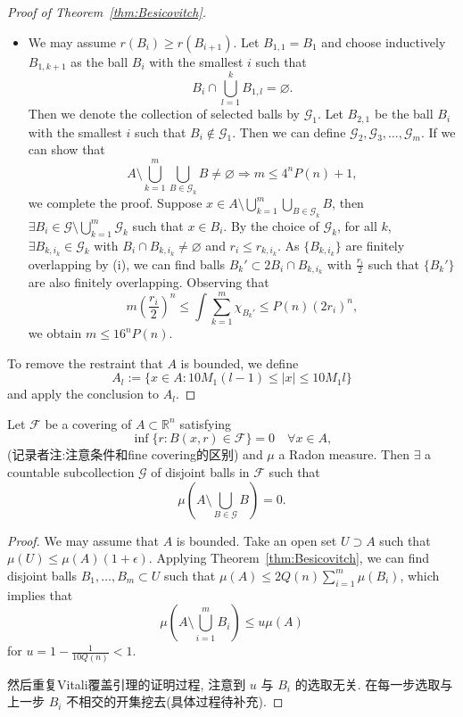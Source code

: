 \begin{proof}[Proof of Theorem~\ref{thm:Besicovitch}]
\begin{itemize}
    \item[(ii)] We may assume $r(B_{i})\geq r(B_{i+1})$. Let $B_{1,1}=B_{1}$ and choose inductively $B_{1,k+1}$ as the ball $B_{i}$ with the smallest $i$ such that $$B_{i}\cap \bigcup _{l=1}^{k}B_{1,l}=\varnothing.$$Then we denote the collection of selected balls by $\mathscr{G}_{1}$.
   Let $B_{2,1}$ be the ball $B_{i}$ with the smallest $i$ such that $B_{i}\not\in \mathscr{G}_{1}$. Then we can define $\mathscr{G}_{2},\mathscr{G}_{3},\dots,\mathscr{G}_{m}$. If we can show that $$A\setminus \bigcup _{k=1}^{m}\bigcup _{B \in \mathscr{G}_{k}}B\neq \varnothing\Longrightarrow m\leq 4^{n}P(n)+1,$$we complete the proof.
   Suppose $x \in A\setminus \bigcup _{k=1}^{m}\bigcup _{B \in \mathscr{G}_{k}}B$, then $\exists B_{i}\in \mathscr{G}\setminus \bigcup _{k=1}^{m}\mathscr{G}_{k}$ such that $x \in B_{i}$. By the choice of $\mathscr{G}_{k}$, for all $k$, $\exists B_{k,i_{k}} \in \mathscr{G}_{k}$ with $B_{i}\cap B_{k,i_{k}}\neq \varnothing$ and $r_{i}\leq r_{k,i_{k}}$. As $\{ B_{k,i_{k}} \}$ are finitely overlapping by (i), we can find balls $B_{k}'\subset 2B_{i}\cap B_{k,i_{k}}$ with $\frac{r_{i}}{2}$ such that $\{ B_{k}' \}$ are also finitely overlapping. Observing that $$m\left( \frac{r_{i}}{2} \right)^{n}\leq \int \sum _{k=1}^{m}\chi _{B_{k}'}\leq P(n)(2r_{i})^{n},$$we obtain $m\leq 16^{n}P(n)$.
\end{itemize}
To remove the restraint that $A$ is bounded, we define
$$
A_{l}:=\{ x \in A: 10M_{1}(l-1)\leq \lvert x \rvert \leq 10M_{1}l \}$$ and apply the conclusion to $A_{l}$.
\end{proof}

\begin{theorem}
    \label{thm:disjoint}
    Let $\mathscr{F}$ be a covering of $A \subset \mathbb{R}^{n}$ satisfying
    $$
    \inf\{ r: B(x,r)\in \mathscr{F} \}=0\quad\forall x \in A,
    $$
    (记录者注:注意条件和fine covering的区别) and $\mu$ a Radon measure. Then $\exists$ a countable subcollection $\mathscr{G}$ of disjoint balls in $\mathscr{F}$ such that
    $$
    \mu\left( A\setminus \bigcup _{B \in \mathscr{G}}B \right)=0.
    $$
\end{theorem}
\begin{proof}
    We may assume that $A$ is bounded. Take an open set $U \supset A$ such that $\mu(U)\leq \mu(A)(1+\epsilon).$ Applying Theorem~\ref{thm:Besicovitch}, we can find disjoint balls $B_{1},\dots,B_{m}\subset U$ such that $\mu(A)\leq 2Q(n)\sum _{i=1}^{m}\mu(B_{i})$, which implies that
    $$
    \mu\left( A\setminus \bigcup _{i=1}^{m}B_{i} \right)\leq u\mu(A)
    $$
    for $u=1- \frac{1}{10Q(n)}<1$.

    然后重复Vitali覆盖引理的证明过程, 注意到 $u$ 与 $B_{i}$ 的选取无关. 在每一步选取与上一步 $B_{i}$ 不相交的开集挖去(具体过程待补充).
\end{proof}


